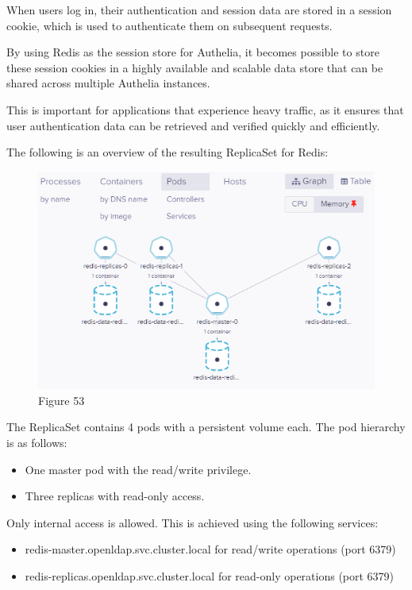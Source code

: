 
When users log in, their authentication and session data are stored in a session cookie, which is used to authenticate them on subsequent requests. 

By using Redis as the session store for Authelia, it becomes possible to store these session cookies in a highly available and scalable data store that can be shared across multiple Authelia instances.  

This is important for applications that experience heavy traffic, as it ensures that user authentication data can be retrieved and verified quickly and efficiently. 


The following is an overview of the resulting ReplicaSet for Redis: 

\begin{figure}[H]\centering
\includegraphics[width=1.0\textwidth,angle=00]{assets/f53.png}
\caption{Figure 53 }
\label{fig:f53}
\end{figure}

The ReplicaSet contains 4 pods with a persistent volume each. The pod hierarchy is as follows: 
\begin{itemize}[label={--}]
\item One master pod with the read/write privilege. 
\item Three replicas with read-only access. 
\end{itemize}
Only internal access is allowed. This is achieved using the following services: 

\begin{itemize}[label={--}]
\item redis-master.openldap.svc.cluster.local for read/write operations (port 6379) 
\item redis-replicas.openldap.svc.cluster.local for read-only operations (port 6379) 
\end{itemize}



